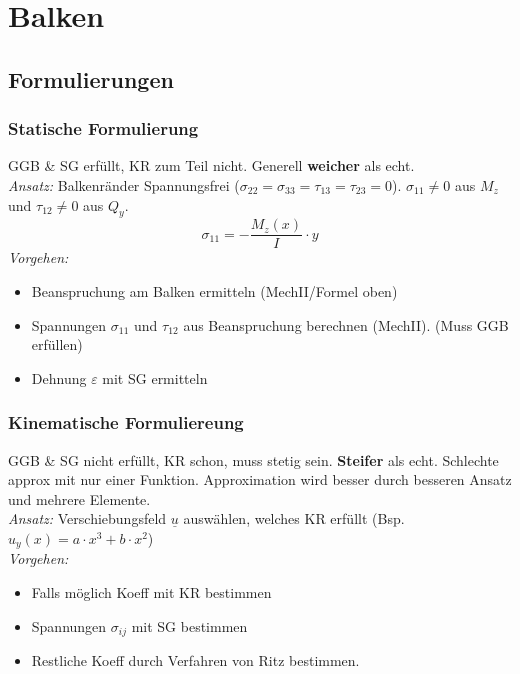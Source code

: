 \section{Balken}
    \subsection{Formulierungen}
        \subsubsection{Statische Formulierung}
            GGB \& SG erfüllt, KR zum Teil nicht. Generell \textbf{weicher} als echt.
            \\\textit{Ansatz:} Balkenränder Spannungsfrei ($\sigma_{22}=\sigma_{33}=\tau_{13}=\tau_{23}=0$). $\sigma_{11} \neq 0$ aus $M_z$ und $\tau_{12} \neq 0$ aus $Q_y$.
                \[\sigma_{11}=-\frac{M_z(x)}{I}\cdot y\]
            \textit{Vorgehen:}
            \begin{itemize}
                \item Beanspruchung am Balken ermitteln (MechII/Formel oben)
                \item Spannungen $\sigma_{11}$ und $\tau_{12}$ aus Beanspruchung berechnen (MechII). (Muss GGB erfüllen)
                \item Dehnung $\varepsilon$ mit SG ermitteln
            \end{itemize}
        \subsubsection{Kinematische Formuliereung}
            GGB \& SG nicht erfüllt, KR schon, muss stetig sein. \textbf{Steifer} als echt. Schlechte approx mit nur einer Funktion. Approximation wird besser durch besseren Ansatz und mehrere Elemente.
            \\\textit{Ansatz:} Verschiebungsfeld $\underline{u}$ auswählen, welches KR erfüllt (Bsp. $u_y(x) = a\cdot x^3+b\cdot x^2$)
            \\\textit{Vorgehen:}
            \begin{itemize}
                \item Falls möglich Koeff mit KR bestimmen
                \item Spannungen $\sigma_{ij}$ mit SG bestimmen
                \item Restliche Koeff durch Verfahren von Ritz bestimmen.
            \end{itemize}
            \vspace{1mm}
            
